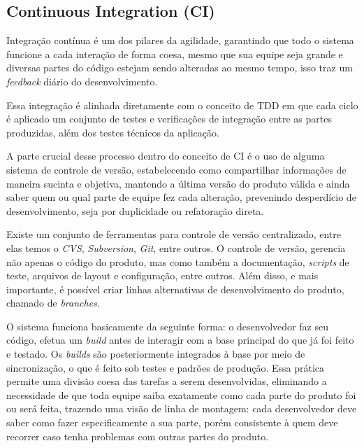 \subsection{Continuous Integration (CI)}
\par Integração contínua é um dos pilares da agilidade, garantindo que todo o sistema funcione a cada interação de forma coesa, mesmo que sua equipe seja grande e diversas partes do código estejam sendo alteradas ao mesmo tempo, isso traz um \emph{feedback} diário do desenvolvimento.
\par Essa integração é alinhada diretamente com o conceito de TDD em que cada ciclo é aplicado um conjunto de testes e verificações de integração entre as partes produzidas, além dos testes técnicos da aplicação.
\par A parte crucial desse processo dentro do conceito de CI é o uso de alguma sistema de controle de versão, estabelecendo como compartilhar informações de maneira sucinta e objetiva, mantendo a última versão do produto válida e ainda saber quem ou qual parte de equipe fez cada alteração, prevenindo desperdício de desenvolvimento, seja por duplicidade ou refatoração direta.
\par Existe um conjunto de ferramentas para controle de versão centralizado, entre elas temos o \emph{CVS}, \emph{Subversion}, \emph{Git}, entre outros. O controle de versão, gerencia não apenas o código do produto, mas como também a documentação, \emph{scripts} de teste, arquivos de layout e configuração, entre outros. Além disso, e mais importante, é possível criar linhas alternativas de desenvolvimento do produto, chamado de \emph{branches}.
\par O sistema funciona basicamente da seguinte forma: o desenvolvedor faz seu código, efetua um \emph{build} antes de interagir com a base principal do que já foi feito e testado. Os \emph{builds} são posteriormente integrados à base por meio de sincronização, o que é feito sob testes e padrões de produção. Essa prática permite uma divisão coesa das tarefas a serem desenvolvidas, eliminando a necessidade de que toda equipe saiba exatamente como cada parte do produto foi ou será feita, trazendo uma visão de linha de montagem: cada desenvolvedor deve saber como fazer especificamente a sua parte, porém consistente à quem deve recorrer caso tenha problemas com outras partes do produto.
